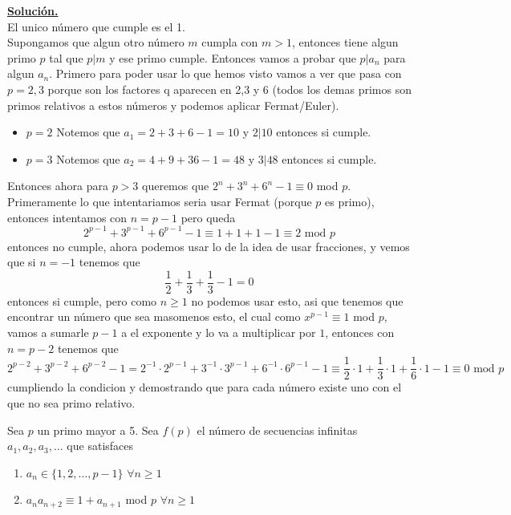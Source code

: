 \documentclass[11pt]{scrartcl}
\begin{document}
\underline{\textbf{Solución.}} \\
El unico número que cumple es el 1. \\
Supongamos que algun otro número $m$ cumpla con $m>1$, entonces tiene algun primo $p$ tal que $p|m$ y ese primo cumple.
Entonces vamos a probar que $p|a_n$ para algun $a_n$.
Primero para poder usar lo que hemos visto vamos a ver que pasa con $p=2,3$ porque son los factores q aparecen en 2,3 y 6 (todos los demas primos son primos relativos a estos números y podemos aplicar Fermat/Euler).
\begin{itemize}
    \item $p=2$ Notemos que $a_1=2+3+6-1=10$ y $2|10$ entonces si cumple.
    \item $p=3$ Notemos que $a_2=4+9+36-1=48$ y $3|48$ entonces si cumple.
\end{itemize}

Entonces ahora para $p>3$ queremos que $2^n+3^n+6^n-1\equiv 0$ mod $p$. \\
Primeramente lo que intentariamos seria usar Fermat (porque $p$ es primo), entonces intentamos con $n=p-1$ pero queda 
$$2^{p-1}+3^{p-1}+6^{p-1}-1 \equiv 1+1+1-1 \equiv 2 \text{ mod } p$$ 
entonces no cumple, ahora podemos usar lo de la idea de usar fracciones, y vemos que si $n=-1$ tenemos que 
$$\frac 1 2 +\frac 1 3 +\frac 1 3 -1 =0$$ 
entonces si cumple, pero como $n\geq 1$ no podemos usar esto, asi que tenemos que encontrar un número que sea masomenos esto, el cual como $x^{p-1}\equiv 1$ mod $p$, vamos a sumarle $p-1$ a el exponente y lo va a multiplicar por $1$, entonces con $n=p-2$ tenemos que 
$$2^{p-2}+3^{p-2}+6^{p-2}-1=2^{-1}\cdot 2^{p-1}+3^{-1}\cdot 3^{p-1}+6^{-1}\cdot 6^{p-1}-1\equiv \frac 1 2 \cdot 1 +\frac 1 3 \cdot 1 +\frac 1 6 \cdot 1 -1\equiv 0 \text{ mod } p $$
cumpliendo la condicion y demostrando que para cada número existe uno con el que no sea primo relativo.

\begin{example}  [PUTNAM 2022/A3]
    Sea $p$ un primo mayor a 5. Sea $f(p)$ el número de secuencias infinitas $a_1,a_2,a_3,\ldots$ que satisfaces
    \begin{center}
        \begin{enumerate}
            \item $a_n \in \{1,2, \ldots,p-1 \}$   $\forall n \geq 1$
            \item $a_na_{n+2}\equiv 1+a_{n+1}$ mod $p$ $\forall n\geq 1$
        \end{enumerate}
    \end{center}
\end{example}
\end{document}
